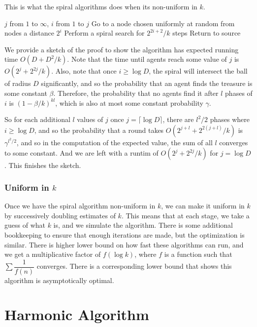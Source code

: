 \documentclass[runningheads,a4paper]{llncs}
\begin{document}
This is what the spiral algorithms does when its non-uniform in $k$. 

\begin{codebox}
\li \For $j$ from $1$ to $\infty$, \Then
\li \For $i$ from $1$ to $j$ \Then
\li Go to a node chosen uniformly at random from nodes a distance $2^{i}$
\li Perform a spiral search for $2^{2i+2}/k$ steps
\li Return to source \End \End 
\end{codebox}

We provide a sketch of the proof to show the algorithm has expected running time $O(D + D^2/k)$. Note that the time until agents reach some value of $j$ is $O(2^j + 2^{2j}/k)$. Also, note that once $i \geq \log D$, the spiral will intersect the ball of radius $D$ significantly, and so the probability that an agent finds the treasure is some constant $\beta$. Therefore, the probability that no agents find it after $l$ phases of $i$ is $(1 - \beta/k)^{kl}$, which is also at most some constant probability $\gamma$.

So for each additional $l$ values of $j$ once $j = \lceil \log D \rceil$, there are $l^2/2$ phases where $i \geq \log D$, and so the probability that a round takes $O(2^{j + l} + 2^{2(j+l)}/k)$ is $\gamma^{l^2/2}$, and so in the computation of the expected value, the sum of all $l$ converges to some constant. And we are left with a runtim of $O(2^{j} + 2^{2j}/k)$ for $j = \log D$. This finishes the sketch.

\subsubsection{Uniform in $k$}

Once we have the spiral algorithm non-uniform in $k$, we can make it uniform in $k$ by successively doubling estimates of $k$. This means that at each stage, we take a guess of what $k$ is, and we simulate the algorithm. There is some additional bookkeeping to ensure that enough iterations are made, but the optimization is similar. There is higher lower bound on how fast these algorithms can run, and we get a multiplicative factor of $f(\log k)$, where $f$ is a function such that $\sum \dfrac{1}{f(n)}$ converges. There is a corresponding lower bound that shows this algorithm is asymptotically optimal.

\section{Harmonic Algorithm}
\label{harmonic}
\end{document}
